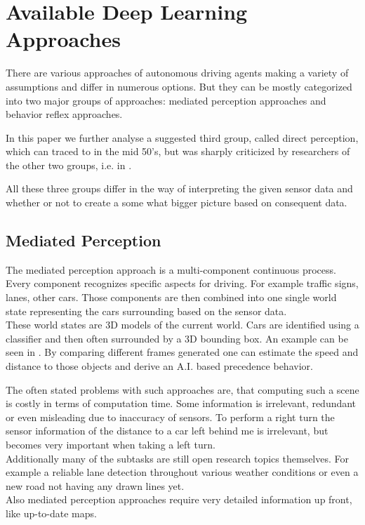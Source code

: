 \chapter{Available Deep Learning Approaches}\label{chapter: Deep Learning Approaches}

There are various approaches of autonomous driving agents making a variety of assumptions and differ in numerous options. But they can be mostly categorized into two major groups of approaches: mediated perception approaches and behavior reflex approaches. \cite{chen2015deepdriving}

In this paper we further analyse a suggested third group, called direct perception, which can traced to \cite{gibson1979ecological} in the mid 50's, but was sharply criticized by researchers of the other two groups, i.e. in \cite{ullman1980against}. %

All these three groups differ in the way of interpreting the given sensor data and whether or not to create a some what bigger picture based on consequent data.

\section{Mediated Perception} \label{sec: Mediated Perception}

The mediated perception approach is a multi-component continuous process. Every component recognizes specific aspects for driving. For example traffic signs, lanes, other cars. Those components are then combined into one single world state representing the cars surrounding based on the sensor data. \cite{KITTI}\\
These world states are 3D models of the current world. Cars are identified using a classifier and then often surrounded by a 3D bounding box. An example can be seen in . By comparing different frames generated one can estimate the speed and distance to those objects and derive an A.I. based precedence behavior. \cite{KITTI}\cite{chen2015deepdriving}

The often stated problems with such approaches are, that computing such a scene is costly in terms of computation time. Some information is irrelevant, redundant or even misleading due to inaccuracy of sensors. To perform a right turn the sensor information of the distance to a car left behind me is irrelevant, but becomes very important when taking a left turn.\\
Additionally many of the subtasks are still open research topics themselves. For example a reliable lane detection throughout various weather conditions or even a new road not having any drawn lines yet. \cite{aly2008real}\\
Also mediated perception approaches require very detailed information up front, like up-to-date maps.

